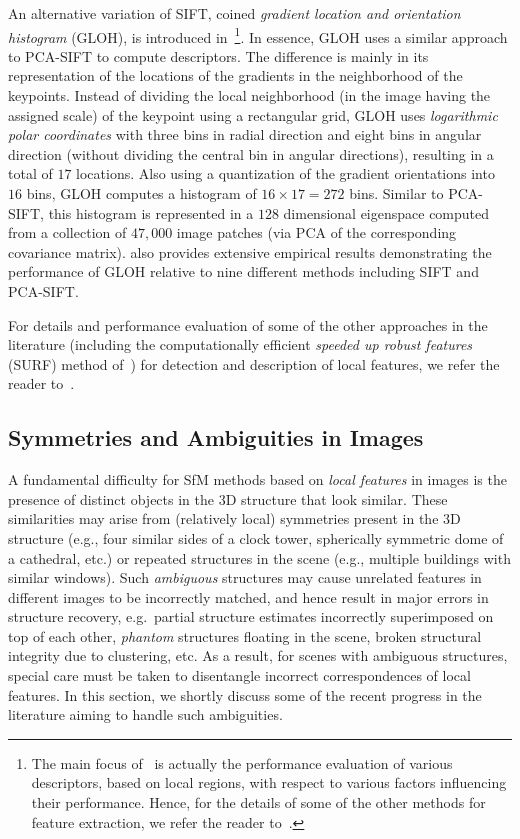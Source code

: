 \documentclass[10pt]{article}
\begin{document}
An alternative variation of SIFT, coined \textit{gradient location and orientation histogram} (GLOH), is introduced in~\cite{GLOH}\footnote{The main focus of~\cite{GLOH} is actually the performance evaluation of various descriptors, based on local regions, with respect to various factors influencing their performance. Hence, for the details of some of the other methods for feature extraction, we refer the reader to~\cite{GLOH}.}. In essence, GLOH uses a similar approach to PCA-SIFT to compute descriptors. The difference is mainly in its representation of the locations of the gradients in the neighborhood of the keypoints. Instead of dividing the local neighborhood (in the image having the assigned scale) of the keypoint using a rectangular grid, GLOH uses \textit{logarithmic polar coordinates} with three bins in radial direction and eight bins in angular direction (without dividing the central bin in angular directions), resulting in a total of $17$ locations. Also using a quantization of the gradient orientations into $16$ bins, GLOH computes a histogram of $16\times17 = 272$ bins. Similar to PCA-SIFT, this histogram is represented in a $128$ dimensional eigenspace computed from a collection of $47,000$ image patches (via PCA of the corresponding covariance matrix). \cite{GLOH} also provides extensive empirical results demonstrating the performance of GLOH relative to nine different methods including SIFT and PCA-SIFT.

For details and performance evaluation of some of the other approaches in the literature (including the computationally efficient \textit{speeded up robust features} (SURF) method of~\cite{SURF}) for detection and description of local features, we refer the reader to~\cite{DescSurvey2}.

\subsection{Symmetries and Ambiguities in Images}
\label{subsec:Ambiguities}
A fundamental difficulty for SfM methods based on \textit{local features} in images is the presence of distinct objects in the $3$D structure that look similar. These similarities may arise from (relatively local) symmetries present in the $3$D structure (e.g., four similar sides of a clock tower, spherically symmetric dome of a cathedral, etc.) or repeated structures in the scene (e.g., multiple buildings with similar windows). Such \textit{ambiguous} structures may cause unrelated features in different images to be incorrectly matched, and hence result in major errors in structure recovery, e.g.~partial structure estimates incorrectly superimposed on top of each other, \textit{phantom} structures floating in the scene, broken structural integrity due to clustering, etc. As a result, for scenes with ambiguous structures, special care must be taken to disentangle incorrect correspondences of local features. In this section, we shortly discuss some of the recent progress in the literature aiming to handle such ambiguities.
\end{document}
